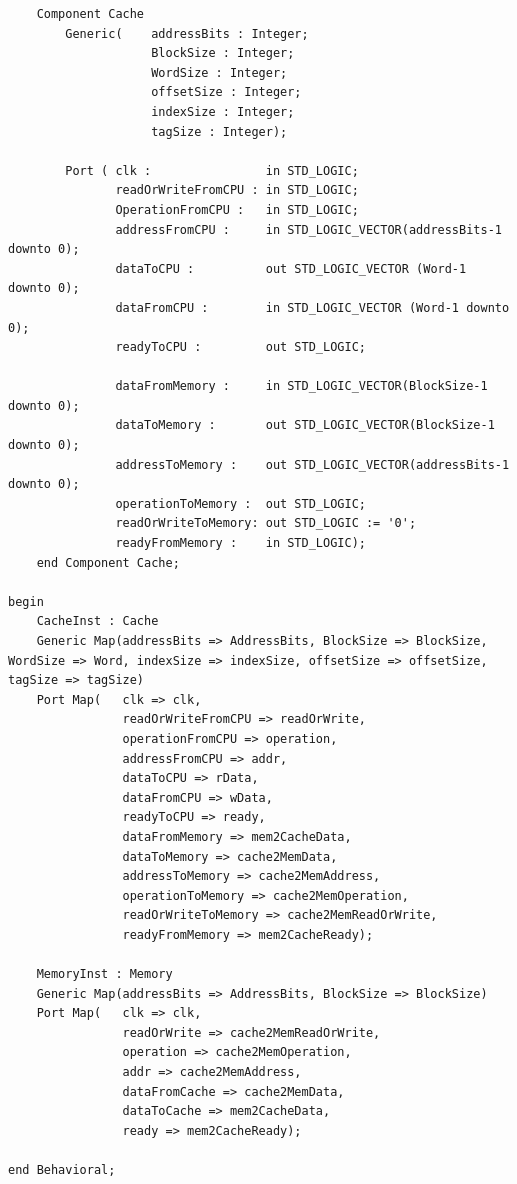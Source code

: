 \documentclass{article}
\begin{document}
\begin{lstlisting}
    Component Cache
        Generic(    addressBits : Integer;
                    BlockSize : Integer;
                    WordSize : Integer;
                    offsetSize : Integer;
                    indexSize : Integer;
                    tagSize : Integer); 
                  
        Port ( clk :                in STD_LOGIC;
               readOrWriteFromCPU : in STD_LOGIC;
               OperationFromCPU :   in STD_LOGIC;
               addressFromCPU :     in STD_LOGIC_VECTOR(addressBits-1 downto 0);
               dataToCPU :          out STD_LOGIC_VECTOR (Word-1 downto 0);
               dataFromCPU :        in STD_LOGIC_VECTOR (Word-1 downto 0);
               readyToCPU :         out STD_LOGIC;
               
               dataFromMemory :     in STD_LOGIC_VECTOR(BlockSize-1 downto 0);
               dataToMemory :       out STD_LOGIC_VECTOR(BlockSize-1 downto 0);
               addressToMemory :    out STD_LOGIC_VECTOR(addressBits-1 downto 0);
               operationToMemory :  out STD_LOGIC;
               readOrWriteToMemory: out STD_LOGIC := '0';
               readyFromMemory :    in STD_LOGIC);
    end Component Cache; 

begin
    CacheInst : Cache
    Generic Map(addressBits => AddressBits, BlockSize => BlockSize, WordSize => Word, indexSize => indexSize, offsetSize => offsetSize, tagSize => tagSize)
    Port Map(   clk => clk,
                readOrWriteFromCPU => readOrWrite,
                operationFromCPU => operation,
                addressFromCPU => addr, 
                dataToCPU => rData,
                dataFromCPU => wData, 
                readyToCPU => ready,
                dataFromMemory => mem2CacheData,
                dataToMemory => cache2MemData, 
                addressToMemory => cache2MemAddress,
                operationToMemory => cache2MemOperation,
                readOrWriteToMemory => cache2MemReadOrWrite,
                readyFromMemory => mem2CacheReady);
    
    MemoryInst : Memory
    Generic Map(addressBits => AddressBits, BlockSize => BlockSize)
    Port Map(   clk => clk,
                readOrWrite => cache2MemReadOrWrite,
                operation => cache2MemOperation,
                addr => cache2MemAddress,
                dataFromCache => cache2MemData,
                dataToCache => mem2CacheData,
                ready => mem2CacheReady);
                
end Behavioral;
\end{lstlisting}
\end{document}
